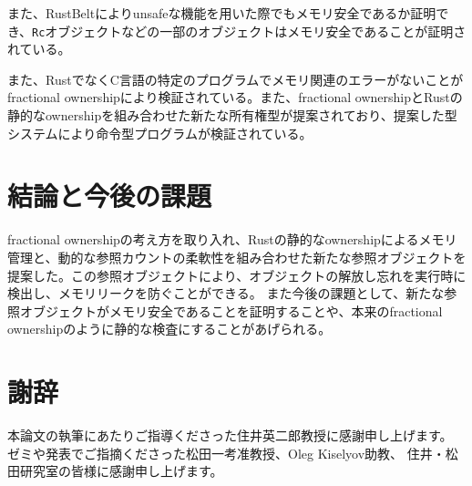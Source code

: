 \documentclass{sumiilab-paper}
\theoremstyle{mystyle}
\numberwithin{definition}{chapter} %
\begin{document}
また、RustBelt\cite{10.1145/3158154}によりunsafeな機能を用いた際でもメモリ安全であるか証明でき、\texttt{Rc}オブジェクトなどの一部のオブジェクトはメモリ安全であることが証明されている。

また、RustでなくC言語の特定のプログラムでメモリ関連のエラーがないことがfractional ownershipにより検証されている。\cite{10.1007/978-3-642-10672-9_11}また、fractional ownershipとRustの静的なownershipを組み合わせた新たな所有権型が提案されており、提案した型システムにより命令型プログラムが検証されている。\cite{10.1007/978-3-031-50521-8_11}


\chapter{結論と今後の課題}
fractional ownershipの考え方を取り入れ、Rustの静的なownershipによるメモリ管理と、動的な参照カウントの柔軟性を組み合わせた新たな参照オブジェクトを提案した。この参照オブジェクトにより、オブジェクトの解放し忘れを実行時に検出し、メモリリークを防ぐことができる。
また今後の課題として、新たな参照オブジェクトがメモリ安全であることを証明することや、本来のfractional ownershipのように静的な検査にすることがあげられる。

\backmatter%
\chapter{謝辞}
本論文の執筆にあたりご指導くださった住井英二郎教授に感謝申し上げます。
ゼミや発表でご指摘くださった松田一考准教授、Oleg Kiselyov助教、
住井・松田研究室の皆様に感謝申し上げます。



\end{document}
